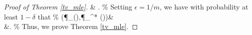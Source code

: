 \begin{proof}[Proof of Theorem \ref{tv_mle}]
&\leq{} .
\%
Setting $\epsilon=1/m$, we have with probability at least $1-\delta$ that
\%
\TV\big(\P_{\hat\phi}(),\P_{\phi^* }()\big)&\leq{} \notag\\
&\cdot{}.
\%
Thus, we prove Theorem \ref{tv_mle}.
\end{proof}